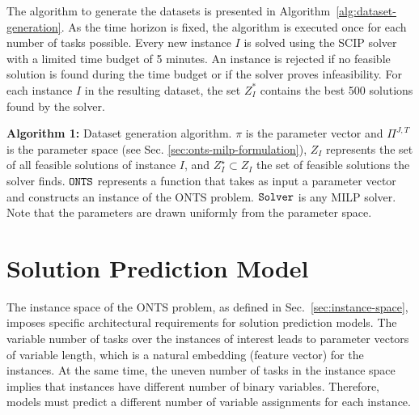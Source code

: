 The algorithm to generate the datasets is presented in Algorithm~\ref{alg:dataset-generation}.
As the time horizon is fixed, the algorithm is executed once for each number of tasks possible.
Every new instance $I$ is solved using the SCIP solver~\cite{bestuzhevaSCIPOptimizationSuite2021} with a limited time budget of 5 minutes.
An instance is rejected if no feasible solution is found during the time budget or if the solver proves infeasibility.
For each instance $I$ in the resulting dataset, the set $Z^*_I$ contains the best 500 solutions found by the solver.

\begin{algorithm}[h]
    \NoCaptionOfAlgo
    \SetAlgoLined
    
    \caption{\textbf{Algorithm 1:} Dataset generation algorithm. $\pi$ is the parameter vector and $\Pi^{J,T}$ is the parameter space (see Sec. \ref{sec:onts-milp-formulation}), $Z_I$ represents the set of all feasible solutions of instance $I$, and $Z_I^\star \subset Z_I$ the set of feasible solutions the solver finds.
    ${\tt ONTS}$ represents a function that takes as input a parameter vector and constructs an instance of the ONTS problem.
    ${\tt Solver}$ is any MILP solver.
    Note that the parameters are drawn uniformly from the parameter space.
    }\label{alg:dataset-generation}
\end{algorithm}


\section{Solution Prediction Model}

The instance space of the ONTS problem, as defined in Sec.~\ref{sec:instance-space}, imposes specific architectural requirements for solution prediction models.
The variable number of tasks over the instances of interest leads to parameter vectors of variable length, which is a natural embedding (feature vector) for the instances.
At the same time, the uneven number of tasks in the instance space implies that instances have different number of binary variables.
Therefore, models must predict a different number of variable assignments for each instance.

